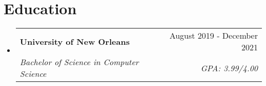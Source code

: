 \documentclass[letterpaper,11pt]{article}
\makeatletter
\newcommand{\resumeItem}[1]{
  \item\small{
    {#1 \vspace{-2pt}}
  }
}
\newcommand{\resumeSubheading}[4]{
  \vspace{-2pt}\item
    \begin{tabular*}{0.97\textwidth}[t]{l@{\extracolsep{\fill}}r}
      \textbf{#1} & #2 \\
      \textit{\small#3} & \textit{\small #4} \\
    \end{tabular*}\vspace{-7pt}
}
\newcommand{\resumeSubHeadingListStart}{\begin{itemize}[leftmargin=0.15in, label={}]}
\newcommand{\resumeSubHeadingListEnd}{\end{itemize}}
\newcommand{\resumeItemListStart}{\begin{itemize}}
\newcommand{\resumeItemListEnd}{\end{itemize}\vspace{-5pt}}
\makeatother
\begin{document}
\section{Education}
  \resumeSubHeadingListStart
        
    \resumeSubheading
      {University of New Orleans}{August 2019 - December 2021}
      {Bachelor of Science in Computer Science}{GPA: 3.99/4.00}
  \resumeSubHeadingListEnd


\end{document}
